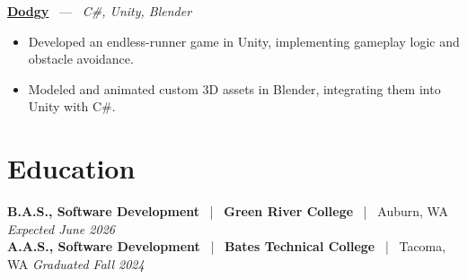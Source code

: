 \documentclass[10pt, letterpaper]{article}
\newcommand{\jobhead}[4]{%
  \vspace{5pt}%
  {\bfseries\color{dark}#1}%
  ~{\color{light}|}~%
  {\bfseries\color{navy}#2}%
  ~{\color{light}|}~%
  {\color{light}#3}%
  \hfill{\color{light}\small\textit{#4}}\\[-2pt]%
}
\newcommand{\projhead}[3]{%
  \vspace{5pt}%
  {\bfseries\color{dark}\href{#2}{#1}}%
  ~{\color{light}---}~%
  {\color{light}\small\textit{#3}}\\[-2pt]%
}
\begin{document}
\projhead{Dodgy}{https://timyd.itch.io/dodgy}{C\#, Unity, Blender}
\begin{itemize}
  \item Developed an endless-runner game in Unity, implementing gameplay logic and obstacle avoidance.
  \item Modeled and animated custom 3D assets in Blender, integrating them into Unity with C\#.
\end{itemize}

\section{Education}

\jobhead{B.A.S., Software Development}{Green River College}{Auburn, WA}{Expected June 2026}
\jobhead{A.A.S., Software Development}{Bates Technical College}{Tacoma, WA}{Graduated Fall 2024}
\end{document}

